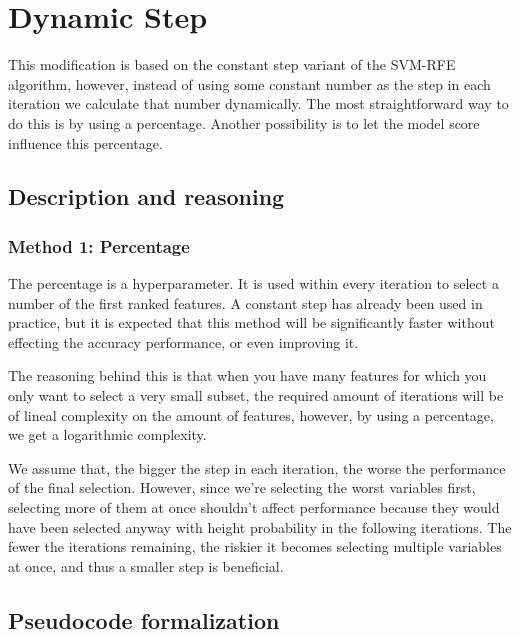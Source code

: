 
\chapter{Dynamic Step} %

\label{Chapter1} %


This modification is based on the constant step variant of the SVM-RFE algorithm, however, instead of using some constant number as the step in each iteration we calculate that number dynamically. The most straightforward way to do this is by using a percentage. Another possibility is to let the model score influence this percentage.

\section{Description and reasoning}

\subsection{Method 1: Percentage}

The percentage is a hyperparameter. It is used within every iteration to select a number of the first ranked features. A constant step has already been used in pract\-ice, but it is expected that this method will be significantly faster without effecting the accuracy performance, or even improving it.

The reasoning behind this is that when you have many features for which you only want to select a very small subset, the required amount of iterations will be of lineal complexity on the amount of features, however, by using a percentage, we get a logarithmic complexity.

We assume that, the bigger the step in each iteration, the worse the performance of the final selection. However, since we're selecting the worst variables first, se\-lect\-ing more of them at once shouldn't affect performance because they would have been selected anyway with height probability in the following iterations. The fewer the iterations remaining, the riskier it becomes selecting multiple variables at once, and thus a smaller step is beneficial.

\section{Pseudocode formalization}

